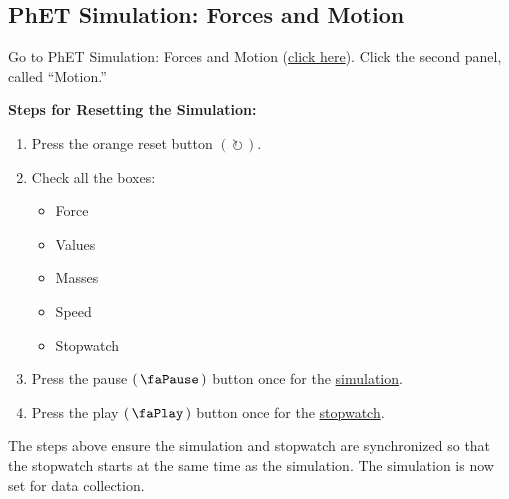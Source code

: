 \documentclass[]{exam}
\begin{document}
\subsection*{PhET Simulation: Forces and Motion}

Go to PhET Simulation: Forces and Motion (\href{https://phet.colorado.edu/sims/html/forces-and-motion-basics/latest/forces-and-motion-basics_all.html}{click here}). Click the second panel, called ``Motion.''


\begin{mdframed}
\noindent \textbf{Steps for Resetting the Simulation:}

\vspace{-1ex}

\begin{enumerate}[itemsep=0pt]
    \item Press the orange reset button $\left(\,\circlearrowright\,\right)$.
    \item Check all the boxes:
    \begin{itemize}[itemsep=0pt]
        \item[]  Force
        \item[]  Values
        \item[]  Masses
        \item[]  Speed
        \item[]  Stopwatch
    \end{itemize}
    \item Press the pause $\left(\,\text{\faPause}\,\right)$ button once for the \underline{simulation}.
    \item Press the play $\left(\,\text{\faPlay}\,\right)$ button once for the \underline{stopwatch}.
\end{enumerate}

\noindent The steps above ensure the simulation and stopwatch are synchronized so that the stopwatch starts at the same time as the simulation. The simulation is now set for data collection.
\end{mdframed}
\end{document}
